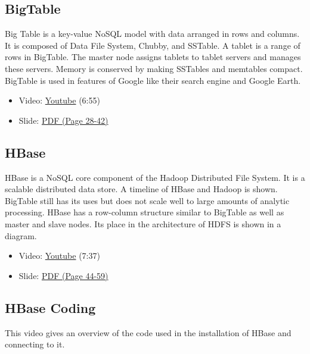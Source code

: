 \subsection{BigTable}\label{bigtable}

Big Table is a key-value NoSQL model with data arranged in rows and
columns. It is composed of Data File System, Chubby, and SSTable. A
tablet is a range of rows in BigTable. The master node assigns tablets
to tablet servers and manages these servers. Memory is conserved by
making SSTables and memtables compact. BigTable is used in features of
Google like their search engine and Google Earth.

\begin{itemize}

\item
  Video: \href{https://www.youtube.com/watch?v=JAlz9AI5I-M}{Youtube}
  (6:55)
\item
  Slide:
  \href{https://drive.google.com/open?id=0B88HKpainTSfaDFNbjNiMm44bnc}{PDF
  (Page 28-42)}
\end{itemize}

\subsection{HBase}\label{hbase}

HBase is a NoSQL core component of the Hadoop Distributed File System.
It is a scalable distributed data store. A timeline of HBase and Hadoop
is shown. BigTable still has its uses but does not scale well to large
amounts of analytic processing. HBase has a row-column structure similar
to BigTable as well as master and slave nodes. Its place in the
architecture of HDFS is shown in a diagram.

\begin{itemize}

\item
  Video: \href{https://www.youtube.com/watch?v=i-ibhuVs-ck}{Youtube}
  (7:37)
\item
  Slide:
  \href{https://drive.google.com/open?id=0B88HKpainTSfaDFNbjNiMm44bnc}{PDF
  (Page 44-59)}
\end{itemize}

\subsection{HBase Coding}\label{hbase-coding}

This video gives an overview of the code used in the installation of
HBase and connecting to it.

